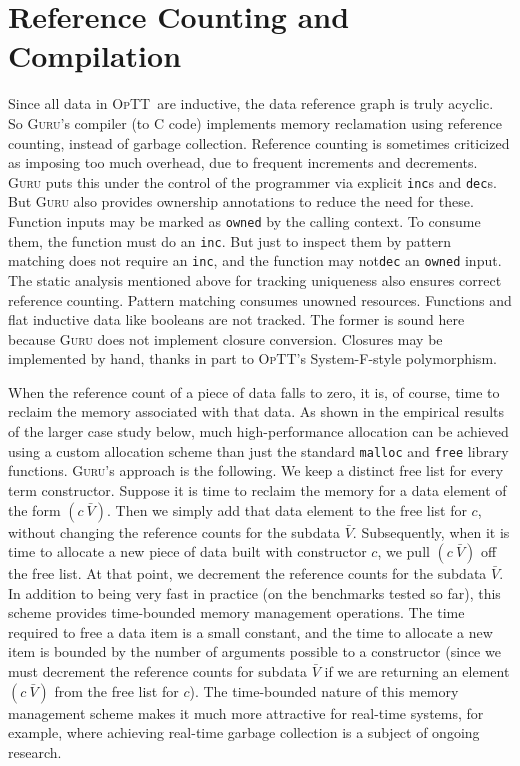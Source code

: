 \documentclass[preprint,natbib]{sigplanconf}
\newcommand{\optt}{\textsc{OpTT}}
\newcommand{\guru}[0]{\textsc{Guru}}
\begin{document}
\section{Reference Counting and Compilation}
\label{sec:compilation}

Since all data in \optt\ are inductive, the data reference graph is
truly acyclic.  So \textsc{Guru}'s compiler (to C code) implements
memory reclamation using reference counting, instead of garbage
collection.  Reference counting is sometimes criticized as imposing
too much overhead, due to frequent increments and decrements.
\textsc{Guru} puts this under the control of the programmer via
explicit \texttt{inc}s and \texttt{dec}s.  But \textsc{Guru} also
provides ownership annotations to reduce the need for these.  Function
inputs may be marked as \texttt{owned} by the calling context.  To
consume them, the function must do an \texttt{inc}.  But just to
inspect them by pattern matching does not require an \texttt{inc}, and
the function may not\texttt{dec} an \texttt{owned} input.  The static
analysis mentioned above for tracking uniqueness also ensures correct
reference counting.  Pattern matching consumes unowned resources.
Functions and flat inductive data like booleans are not tracked.  The
former is sound here because \textsc{Guru} does not implement closure
conversion.  Closures may be implemented by hand, thanks in part to
\optt's System-F-style polymorphism.  

When the reference count of a piece of data falls to zero, it is, of
course, time to reclaim the memory associated with that data.  As
shown in the empirical results of the larger case study below, much
high-performance allocation can be achieved using a custom allocation
scheme than just the standard \texttt{malloc} and \texttt{free}
library functions.  \guru's approach is the following.  We keep a
distinct free list for every term constructor.  Suppose it is time to
reclaim the memory for a data element of the form $(c\ \bar{V})$.
Then we simply add that data element to the free list for $c$, without
changing the reference counts for the subdata $\bar{V}$.
Subsequently, when it is time to allocate a new piece of data built
with constructor $c$, we pull $(c\ \bar{V})$ off the free list.  At
that point, we decrement the reference counts for the subdata
$\bar{V}$.  In addition to being very fast in practice (on the
benchmarks tested so far), this scheme provides time-bounded memory
management operations.  The time required to free a data item is a
small constant, and the time to allocate a new item is bounded by the
number of arguments possible to a constructor (since we must decrement
the reference counts for subdata $\bar{V}$ if we are returning an
element $(c\ \bar{V})$ from the free list for $c$).  The time-bounded
nature of this memory management scheme makes it much more attractive
for real-time systems, for example, where achieving real-time garbage
collection is a subject of ongoing research.
\end{document}
